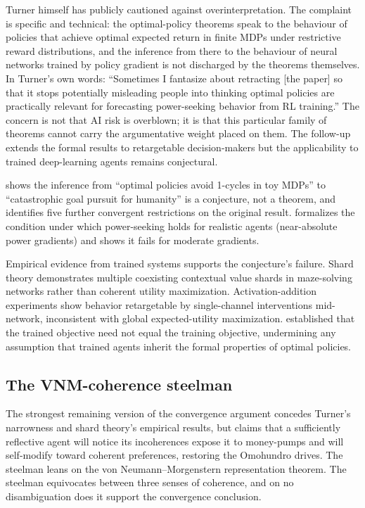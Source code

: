 \documentclass[11pt,twocolumn]{article}
\begin{document}
Turner himself has publicly cautioned against overinterpretation. The
complaint is specific and technical: the optimal-policy theorems speak to
the behaviour of policies that achieve optimal expected return in finite
MDPs under restrictive reward distributions, and the inference from there
to the behaviour of neural networks trained by policy gradient is not
discharged by the theorems themselves. In Turner's own words: ``Sometimes I
fantasize about retracting [the paper] so that it stops potentially
misleading people into thinking optimal policies are practically relevant
for forecasting power-seeking behavior from RL training.'' The concern is
not that AI risk is overblown; it is that this particular family of
theorems cannot carry the argumentative weight placed on them. The
follow-up \citep{TurnerTadepalli2022} extends the formal results to
retargetable decision-makers but the applicability to trained deep-learning
agents remains conjectural.

\citet{Thorstad2024} shows the inference from ``optimal policies avoid
1-cycles in toy MDPs'' to ``catastrophic goal pursuit for humanity'' is a
conjecture, not a theorem, and identifies five further convergent
restrictions on the original result. \citet{Tarsney2025} formalizes the
condition under which power-seeking holds for realistic agents
(near-absolute power gradients) and shows it fails for moderate gradients.

Empirical evidence from trained systems supports the conjecture's failure.
Shard theory \citep{Mini2023} demonstrates multiple coexisting contextual
value shards in maze-solving networks rather than coherent utility
maximization. Activation-addition experiments \citep{Turner2023} show
behavior retargetable by single-channel interventions mid-network,
inconsistent with global expected-utility maximization. \citet{Hubinger2019}
established that the trained objective need not equal the training
objective, undermining any assumption that trained agents inherit the
formal properties of optimal policies.

\subsection{The VNM-coherence steelman}

The strongest remaining version of the convergence argument concedes
Turner's narrowness and shard theory's empirical results, but claims that
a sufficiently reflective agent will notice its incoherences expose it to
money-pumps and will self-modify toward coherent preferences, restoring the
Omohundro drives. The steelman leans on the von Neumann--Morgenstern
representation theorem. The steelman equivocates between three senses of
coherence, and on no disambiguation does it support the convergence
conclusion.
\end{document}
